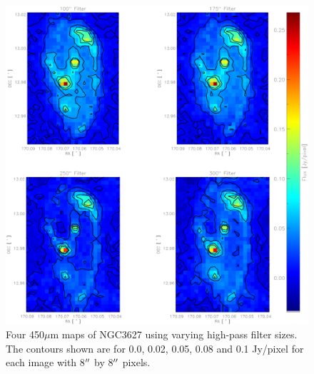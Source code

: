 \begin{figure}
  \centering
  \includegraphics[scale=0.5]{obs_imgs/450_comparison_4.eps}
  \caption[450$\mu$m High-Pass Filter Images]{Four 450$\mu$m maps of NGC3627 using varying high-pass filter sizes.  The contours shown are for 0.0, 0.02, 0.05, 0.08 and 0.1 Jy/pixel for each image with 8$\mbox{$^{\prime\prime}$}$ by 8$\mbox{$^{\prime\prime}$}$ pixels.}
    \label{450_flt}
\end{figure}

